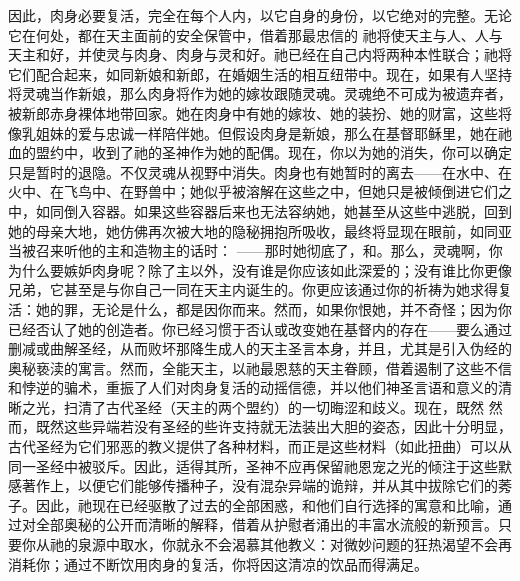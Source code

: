 
因此，肉身必要复活，完全在每个人内，以它自身的身份，以它绝对的完整。无论它在何处，都在天主面前的安全保管中，借着那最忠信的  祂将使天主与人、人与天主和好，并使灵与肉身、肉身与灵和好。祂已经在自己内将两种本性联合；祂将它们配合起来，如同新娘和新郎，在婚姻生活的相互纽带中。现在，如果有人坚持将灵魂当作新娘，那么肉身将作为她的嫁妆跟随灵魂。灵魂绝不可成为被遗弃者，被新郎赤身裸体地带回家。她在肉身中有她的嫁妆、她的装扮、她的财富，这些将像乳姐妹的爱与忠诚一样陪伴她。但假设肉身是新娘，那么在基督耶稣里，她在祂血的盟约中，收到了祂的圣神作为她的配偶。现在，你以为她的消失，你可以确定只是暂时的退隐。不仅灵魂从视野中消失。肉身也有她暂时的离去——在水中、在火中、在飞鸟中、在野兽中；她似乎被溶解在这些之中，但她只是被倾倒进它们之中，如同倒入容器。如果这些容器后来也无法容纳她，她甚至从这些中逃脱，回到她的母亲大地，她仿佛再次被大地的隐秘拥抱所吸收，最终将显现在眼前，如同亚当被召来听他的主和造物主的话时： ——那时她彻底了，和。那么，灵魂啊，你为什么要嫉妒肉身呢？除了主以外，没有谁是你应该如此深爱的；没有谁比你更像兄弟，它甚至是与你自己一同在天主内诞生的。你更应该通过你的祈祷为她求得复活：她的罪，无论是什么，都是因你而来。然而，如果你恨她，并不奇怪；因为你已经否认了她的创造者。你已经习惯于否认或改变她在基督内的存在——要么通过删减或曲解圣经，从而败坏那降生成人的天主圣言本身，并且，尤其是引入伪经的奥秘亵渎的寓言。然而，全能天主，以祂最恩慈的天主眷顾，借着遏制了这些不信和悖逆的骗术，重振了人们对肉身复活的动摇信德，并以他们神圣言语和意义的清晰之光，扫清了古代圣经（天主的两个盟约）的一切晦涩和歧义。现在，既然  然而，既然这些异端若没有圣经的些许支持就无法装出大胆的姿态，因此十分明显，古代圣经为它们邪恶的教义提供了各种材料，而正是这些材料（如此扭曲）可以从同一圣经中被驳斥。因此，适得其所，圣神不应再保留祂恩宠之光的倾注于这些默感著作上，以便它们能够传播种子，没有混杂异端的诡辩，并从其中拔除它们的莠子。因此，祂现在已经驱散了过去的全部困惑，和他们自行选择的寓意和比喻，通过对全部奥秘的公开而清晰的解释，借着从护慰者涌出的丰富水流般的新预言。只要你从祂的泉源中取水，你就永不会渴慕其他教义：对微妙问题的狂热渴望不会再消耗你；通过不断饮用肉身的复活，你将因这清凉的饮品而得满足。\par

